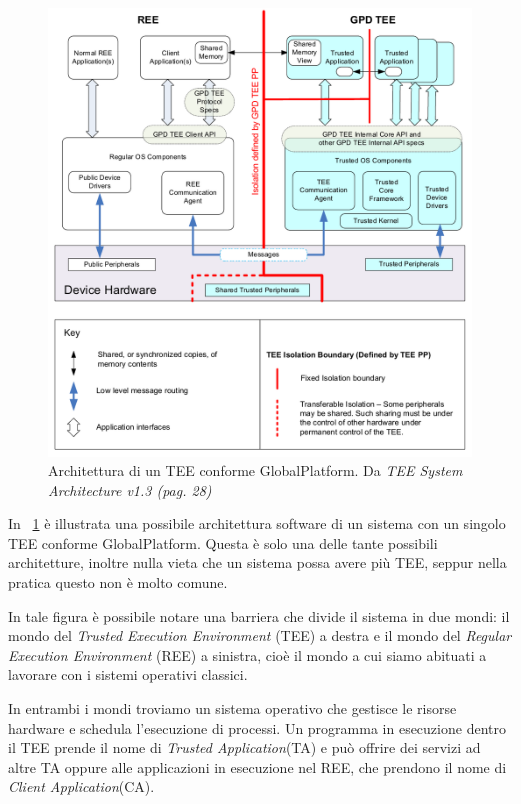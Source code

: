 \documentclass[12pt,italian]{report}
\begin{document}
\begin{figure}
    \centering
    \includegraphics[width=1\textwidth]{immagini/tee-system-architecture}
    \caption{
        Architettura di un TEE conforme GlobalPlatform. 
        Da \textit{TEE System Architecture v1.3 (pag. 28)}
        \cite{gp2020systemarchitecture}
    }
    \label{fig:tee-system-architecture}
\end{figure}

In \figurename~\ref{fig:tee-system-architecture} è illustrata una possibile
architettura software di un sistema con un singolo TEE conforme
GlobalPlatform. Questa è solo una delle tante possibili architetture, inoltre
nulla vieta che un sistema possa avere più TEE, seppur nella pratica
questo non è molto comune.

In tale figura è possibile notare una barriera che divide il sistema in due
mondi: il mondo del \textit{Trusted Execution Environment} (TEE) a destra
e il mondo del \textit{Regular Execution Environment} (REE) a sinistra, cioè
il mondo a cui siamo abituati a lavorare con i sistemi operativi classici.

In entrambi i mondi troviamo un sistema operativo che gestisce le risorse
hardware e schedula l'esecuzione di processi. Un programma in esecuzione
dentro il TEE prende il nome di \textit{Trusted Application}(TA) e può
offrire dei servizi ad altre TA oppure alle applicazioni in esecuzione nel REE,
che prendono il nome di \textit{Client Application}(CA).
\end{document}
